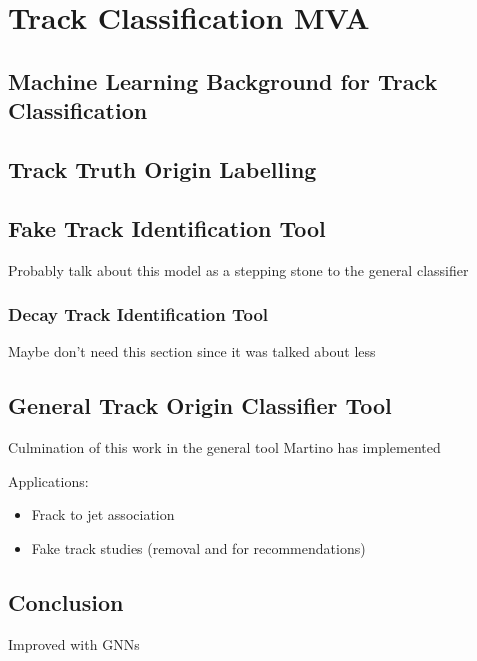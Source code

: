 \chapter{Track Classification MVA}\label{chap:track_classification_mva}


\section{Machine Learning Background for Track Classification}\label{sec:ml_track_classification}
\section{Track Truth Origin Labelling}\label{sec:track_labelling}
\section{Fake Track Identification Tool}\label{sec:fake_track_mva}
Probably talk about this model as a stepping stone to the general classifier

\subsection{\bhadron Decay Track Identification Tool}\label{sec:keep hf mva}
Maybe don't need this section since it was talked about less


\section{General Track Origin Classifier Tool}\label{sec:general_track_classifier}
Culmination of this work in the general tool Martino has implemented

Applications:
\begin{itemize}
    \item Frack to jet association
    \item Fake track studies (removal and for recommendations)
\end{itemize}

\section{Conclusion}

Improved with GNNs
